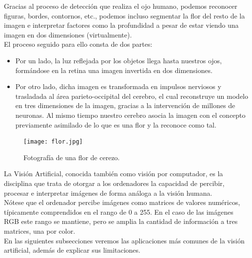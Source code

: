 \documentclass[a4paper,11pt]{article}
\begin{document}
\noindent
Gracias al proceso de detección que realiza el ojo humano, podemos reconocer figuras, bordes, contornos, etc., podemos incluso segmentar la flor del resto de la imagen e interpretar factores como la profundidad a pesar de estar viendo una imagen en dos dimensiones (virtualmente).\\

\noindent
El proceso seguido para ello consta de dos partes:
\begin{itemize}
\item Por un lado, la luz reflejada por los objetos llega hasta nuestros ojos, formándose en la retina una imagen invertida en dos
dimensiones. 
\item Por otro lado, dicha imagen es transformada en impulsos nerviosos y trasladada al área parieto-occipital del cerebro, 
el cual reconstruye un modelo en tres dimensiones de la imagen, gracias a la intervención de millones de neuronas. Al mismo tiempo nuestro cerebro asocia la imagen con el concepto previamente asimilado de lo que es una flor y la reconoce como tal.
\end{itemize}

\begin{figure}[H]
\centering
\texttt{[image: flor.jpg]}
\caption{Fotografía de una flor de cerezo.}
\end{figure}
\noindent
La Visión Artificial, conocida también como visión por computador, es la disciplina que trata de otorgar a los ordenadores la capacidad de percibir, procesar  e interpretar imágenes de forma análoga a la visión humana. \\Nótese que el ordenador percibe imágenes como matrices de valores numéricos, típicamente comprendidos en el rango de 0 a 255. En el caso de las imágenes RGB este rango se mantiene, pero se amplia la cantidad de información a tres matrices, una por color.\\

\noindent
En las siguientes subsecciones veremos las aplicaciones más comunes de la visión artificial, además de explicar sus limitaciones.
\end{document}
